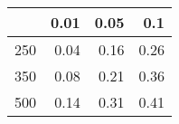 % 
\begin{tabular}{rrrr}
  \hline
 & 0.01 & 0.05 & 0.1 \\ 
  \hline
250 & 0.04 & 0.16 & 0.26 \\ 
  350 & 0.08 & 0.21 & 0.36 \\ 
  500 & 0.14 & 0.31 & 0.41 \\ 
   \hline
\end{tabular}
